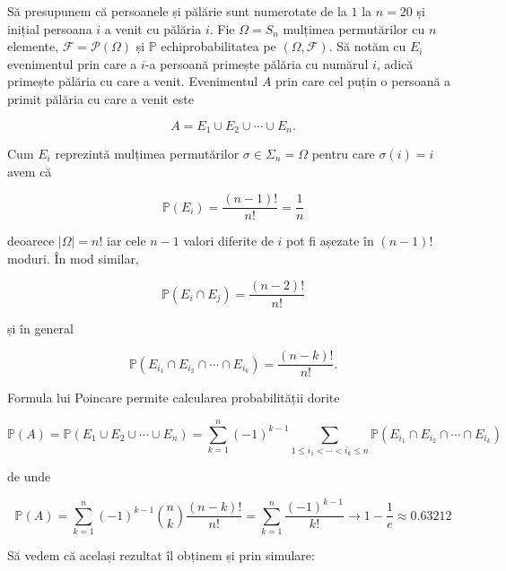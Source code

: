 \documentclass[]{article}
\def\S{{\Sigma}}
\begin{document}
Să presupunem că persoanele și pălărie sunt numerotate de la \(1\) la
\(n = 20\) și inițial persoana \(i\) a venit cu pălăria \(i\). Fie
\(\Omega = S_n\) mulțimea permutărilor cu \(n\) elemente,
\(\mathcal{F} = \mathcal{P}(\Omega)\) și \(\mathbb{P}\)
echiprobabilitatea pe \((\Omega, \mathcal{F})\). Să notăm cu \(E_i\)
evenimentul prin care a \(i\)-a persoană primește pălăria cu numărul
\(i\), adică primește pălăria cu care a venit. Evenimentul \(A\) prin
care cel puțin o persoană a primit pălăria cu care a venit este

\[
  A = E_1 \cup E_2 \cup\cdots\cup E_n.
\]

Cum \(E_i\) reprezintă mulțimea permutărilor \(\sigma\in\S_n = \Omega\)
pentru care \(\sigma(i) = i\) avem că

\[
  \mathbb{P}(E_i) = \frac{(n-1)!}{n!} = \frac{1}{n}
\]

deoarece \(|\Omega| = n!\) iar cele \(n-1\) valori diferite de \(i\) pot
fi așezate în \((n-1)!\) moduri. În mod similar,

\[
  \mathbb{P}(E_i\cap E_j) = \frac{(n-2)!}{n!}
\]

și în general

\[
  \mathbb{P}(E_{i_1}\cap E_{i_2}\cap\cdots\cap E_{i_k}) = \frac{(n-k)!}{n!}.
\]

Formula lui Poincare permite calcularea probabilității dorite

\[
  \mathbb{P}(A) = \mathbb{P}(E_1 \cup E_2 \cup\cdots\cup E_n) = \sum_{k = 1}^{n} (-1)^{k-1} \sum_{1\leq i_1<\cdots<i_k\leq n}\mathbb{P}(E_{i_1}\cap E_{i_2}\cap\cdots\cap E_{i_k})
\]

de unde

\[
  \mathbb{P}(A) = \sum_{k = 1}^{n} (-1)^{k-1} \binom{n}{k}\frac{(n-k)!}{n!} = \sum_{k = 1}^{n} \frac{(-1)^{k-1}}{k!} \to 1 - \frac{1}{e} \approx 0.63212
\]

Să vedem că același rezultat îl obținem și prin simulare:
\end{document}
